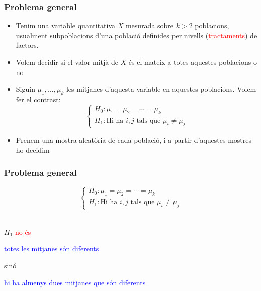 \documentclass[12pt,t]{beamer}
\newcommand{\red}[1]{\textcolor{red}{#1}}
\newcommand{\blue}[1]{\textcolor{blue}{#1}}
\theoremstyle{plain}
\theoremstyle{definition}
\begin{document}
\begin{frame}
\frametitle{Problema general}

\begin{itemize}
\item Tenim una variable quantitativa $X$ mesurada sobre $k>2$ poblacions, usualment subpoblacions d'una població definides per nivells (\red{tractaments}) de factors. \medskip

\item Volem decidir si el valor mitjà de $X$ és el mateix a totes aquestes  poblacions o no
\medskip

\item Siguin $\mu_1,\ldots,\mu_k$ les mitjanes d'aquesta variable en aquestes  poblacions. Volem fer el contrast:
$$
\left\{
\begin{array}{l}
H_0 : \mu_1 =\mu_2 =\cdots =\mu_k \\
H_1 : \mbox{Hi ha  }i,j\mbox{ tals que }  \mu_i \not=\mu_j
\end{array}
\right.
$$

\item Prenem una mostra aleatòria de cada població, i a partir d'aquestes mostres ho decidim
\end{itemize}



\end{frame}


\begin{frame}
\frametitle{Problema general}

$$
\left\{
\begin{array}{l}
H_0 : \mu_1 =\mu_2 =\cdots =\mu_k \\
H_1 : \mbox{Hi ha  }i,j\mbox{ tals que }  \mu_i \not=\mu_j
\end{array}
\right.
$$\

$H_1$ \red{no és}
\begin{center}
\blue{totes les mitjanes són diferents}
\end{center}
sinó
\begin{center}
\blue{hi ha almenys dues mitjanes que són diferents}
\end{center}
\end{frame}
\end{document}
